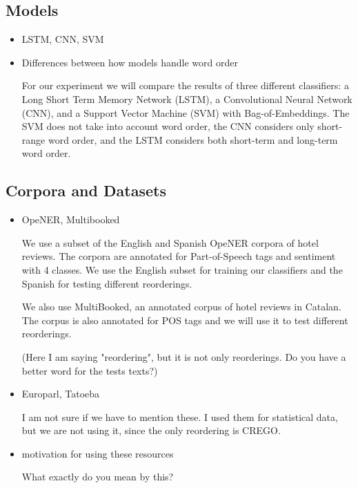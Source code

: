 \documentclass[11pt,a4paper]{article}
\begin{document}
\subsection{Models}

\begin{itemize}
\item LSTM, CNN, SVM
\item Differences between how models handle word order

For our experiment we will compare the results of three different classifiers: a Long Short Term Memory Network (LSTM), a Convolutional Neural Network (CNN), and a Support Vector Machine (SVM) with Bag-of-Embeddings. The SVM does not take into account word order, the CNN considers only short-range word order, and the LSTM considers both short-term and long-term word order.

\end{itemize}

\subsection{Corpora and Datasets}

\begin{itemize}
\item OpeNER, Multibooked

We use a subset of the English and Spanish OpeNER corpora of hotel reviews. The corpora are annotated for Part-of-Speech tags and sentiment with 4 classes. We use the English subset for training our classifiers and the Spanish for testing different reorderings.

We also use MultiBooked, an annotated corpus of hotel reviews in Catalan. The corpus is also annotated for POS tags and we will use it to test different reorderings.

(Here I am saying "reordering", but it is not only reorderings. Do you have a better word for the tests texts?)

\item Europarl, Tatoeba

I am not sure if we have to mention these. I used them for statistical data, but we are not using it, since the only reordering is CREGO.

\item motivation for using these resources

What exactly do you mean by this?

\end{itemize}
\end{document}
